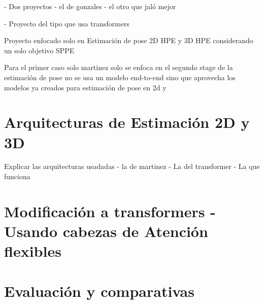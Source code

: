 - Dos proyectos
- el de gonzales
- el otro que jaló mejor

- Proyecto del tipo que usa transformers

Proyecto enfocado solo en Estimación de pose 2D HPE y 3D HPE considerando un solo objetivo SPPE

Para el primer caso solo martinez solo se enfoca en el segundo stage de la estimación de pose
no se usa un modelo end-to-end sino que aprovecha los modelos ya creados para estimación de pose
en 2d y

\section{Arquitecturas de Estimación 2D y 3D}

Explicar las arquitecturas usadadas
- la de martinez
- La del transformer
- La que funciona

\section{Modificación a transformers - Usando cabezas de Atención flexibles}

\section{Evaluación y comparativas}
